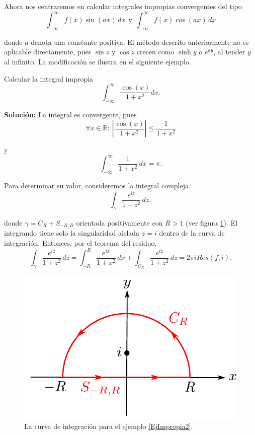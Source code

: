 Ahora nos centraremos en calcular integrales impropias convergentes del tipo
$$\int_{-\infty}^{\infty} f(x) \sin(ax) \,dx ~~\mbox{y}~~ \int_{-\infty}^{\infty} f(x) \cos(ax) \,dx$$

donde $a$ denota una constante positiva. El método descrito anteriormente no es aplicable directamente, pues $\sin z$ y $\cos z$ crecen como $\sinh y$ o $e^{ay}$, al tender $y$ al infinito. La modificación se ilustra en el siguiente ejemplo.

\begin{ejemplo} \label{EjImpropia2}
Calcular la integral impropia
$$\int_{- \infty}^{\infty} \frac{\cos(x)}{1+x^2} dx.$$

\textbf{Solución:} La integral es convergente, pues
$$\forall x \in \mathbb{R}: ~\left| \frac{\cos(x)}{1+x^2} \right| \leq \frac{1}{1+x^2}$$

y
$$\int_{-\infty}^{\infty} \frac{1}{1+x^2} \,dx = \pi.$$

Para determinar su valor, consideremos la integral compleja
$$\int_{\gamma} \frac{e^{iz}}{1+z^2} \,dz,$$

donde $\gamma = C_R + S_{-R,R}$ orientada positivamente con $R > 1$ (ver figura \ref{fig:IntegralImpropia3}). El integrando tiene solo la singularidad aislada $z = i$ dentro de la curva de integración. Entonces, por el teorema del residuo,
$$\int_{\gamma} \frac{e^{iz}}{1+z^2} \,dz = \int_{-R}^R \frac{e^{ix}}{1+x^2} \,dx + \int_{C_R} \frac{e^{iz}}{1+z^2} \,dz = 2\pi i Res(f,i).$$

\begin{figure}[H]
    \centering
    \includegraphics[scale = 0.6]{Figuras/IntegralImpropia3.pdf}
    \caption{La curva de integración para el ejemplo \ref{EjImpropia2}.}
    \label{fig:IntegralImpropia3}
\end{figure}


\end{ejemplo}
